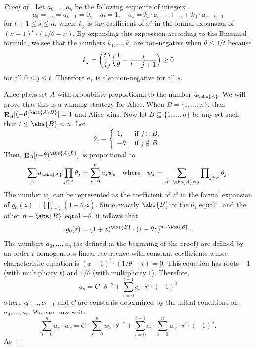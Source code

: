 \documentclass{toc}
\DeclareMathOperator\E{\mathop{\bf E}}
\begin{document}
\begin{proof}[Proof of ]
Let $a_0, \dots, a_n$ be the following sequence of integers:
\[ a_0=\dots=a_{t-1}=0, \quad a_t=1, \quad a_s = k_t \cdot a_{s-1} + \dots + k_0 \cdot a_{s-t-1} \]   
for $t+1\leq s\leq n$, where $k_j$ is the coefficient of $x^j$ in the formal expansion of $(x+1)^t\cdot
(1/\theta - x)$.
By expanding this expression according to the Binomial formula, we see
that the numbers $k_0, \dots, k_t$ are non-negative when $\theta \leq 1/t$ because
\[ k_j = \binom{t}{j}\Bigl(\frac{1}{\theta} - \frac{j}{t-j+1}\Bigr) \geq 0 \]
for all $0\leq j\leq t$.  Therefore $a_s$ is also non-negative for all $s$.
	
Alice plays set $A$ with probability proportional to the number $a_{\abs{A}}$.  We will prove that this is a winning strategy for Alice.  When $B = \{1, \dots, n\}$, then $\E_A[(-\theta)^{\abs{A \setminus B}}] = 1$ and Alice wins.  Now let $B\subseteq \{1, \dots, n\}$ be any set such that $t \leq \abs{B} < n$. Let
	\[ \theta_j = \begin{cases}1, &\text{if $j \in B$}, \\ -\theta, &\text{if $j \not\in B$}.\end{cases} \]
	Then, $\E_A[(-\theta)^{\abs{A \setminus B}}]$ is proportional to 
	\[  \sum_A a_{\abs{A}} \prod_{j \in A} \theta_j = \sum_{s = 0}^n a_s w_s \quad\text{where}\quad w_s = \sum_{A\colon \abs{A} = s} \prod\nolimits_{j \in A} \theta_j. \]
The number $w_s$ can be represented as the coefficient of $z^s$ in the formal expansion of $g_0(z) = \prod_{j=1}^n (1 + \theta_j z)$.  Since exactly
$\abs{B}$ of the $\theta_j$  
equal $1$ and the other $n - \abs{B}$ equal $-\theta$, it follows that
	\begin{equation} \label{eq:g_t_closed_form} g_0(z)=(1+z)^{\abs{B}}
	\cdot(1 - \theta z)^{n-\abs{B}}.
	\end{equation}
	The numbers $a_0,\dots,a_n$ (as defined in the beginning of the proof) are defined by an order-$t$ homogeneous linear
%
recurrence %
with constant coefficients whose characteristic equation is
$(x + 1)^t \cdot (1/\theta - x) = 0$. 
This equation has roots $-1$ (with multiplicity $t$) and $1/\theta$ 
(with multiplicity $1$). Therefore,
\[ a_s = C \cdot \theta^{-s} + \sum_{i=0}^{t-1} c_i \cdot s^i \cdot (-1)^s \]
where $c_0, \dots, c_{t-1}$ and $C$ are constants determined by the initial conditions on $a_0, \dots, a_t$.  We can now write
\[ \sum_{s=0}^n a_s \cdot w_s = C \cdot \sum_{s=0}^n w_s \cdot \theta^{-s} +
\sum_{i=0}^{t-1} c_i \cdot \sum_{s=0}^n w_s \cdot s^i \cdot (-1)^s. \] As

\end{proof}
\end{document}
